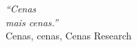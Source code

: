 \cleardoublepage
\thispagestyle{plain}

\vspace*{8cm}

\begin{flushright}
  \textsl{``Cenas\\mais cenas.''}\\
\vspace*{1.5cm}
    Cenas, cenas, Cenas Research
\end{flushright}





